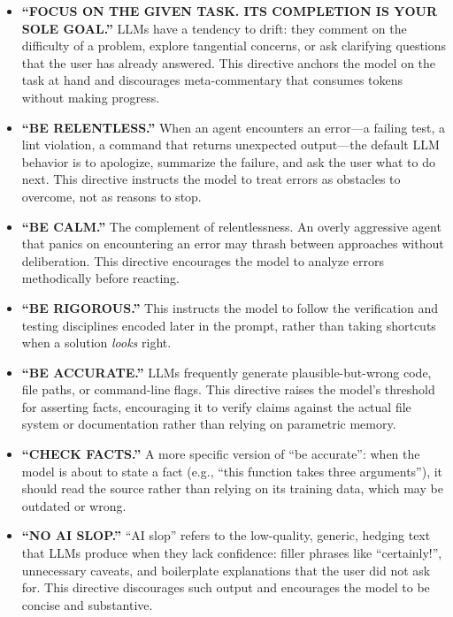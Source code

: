 \documentclass{article}
\begin{document}
\begin{itemize}[nosep]
\item \textbf{``FOCUS ON THE GIVEN TASK. ITS COMPLETION IS YOUR SOLE
  GOAL.''} LLMs have a tendency to drift: they comment on the
  difficulty of a problem, explore tangential concerns, or ask
  clarifying questions that the user has already answered.  This
  directive anchors the model on the task at hand and discourages
  meta-commentary that consumes tokens without making progress.

\item \textbf{``BE RELENTLESS.''} When an agent encounters an
  error---a failing test, a lint violation, a command that returns
  unexpected output---the default LLM behavior is to apologize,
  summarize the failure, and ask the user what to do next.  This
  directive instructs the model to treat errors as obstacles to
  overcome, not as reasons to stop.

\item \textbf{``BE CALM.''} The complement of relentlessness.  An
  overly aggressive agent that panics on encountering an error may
  thrash between approaches without deliberation.  This directive
  encourages the model to analyze errors methodically before reacting.

\item \textbf{``BE RIGOROUS.''} This instructs the model to follow
  the verification and testing disciplines encoded later in the
  prompt, rather than taking shortcuts when a solution \emph{looks}
  right.

\item \textbf{``BE ACCURATE.''} LLMs frequently generate
  plausible-but-wrong code, file paths, or command-line flags.  This
  directive raises the model's threshold for asserting facts,
  encouraging it to verify claims against the actual file system or
  documentation rather than relying on parametric memory.

\item \textbf{``CHECK FACTS.''} A more specific version of ``be
  accurate'': when the model is about to state a fact (e.g., ``this
  function takes three arguments''), it should read the source rather
  than relying on its training data, which may be outdated or wrong.

\item \textbf{``NO AI SLOP.''} ``AI slop'' refers to the low-quality,
  generic, hedging text that LLMs produce when they lack confidence:
  filler phrases like ``certainly!'', unnecessary caveats, and
  boilerplate explanations that the user did not ask for.  This
  directive discourages such output and encourages the model to be
  concise and substantive.
\end{itemize}
\end{document}
